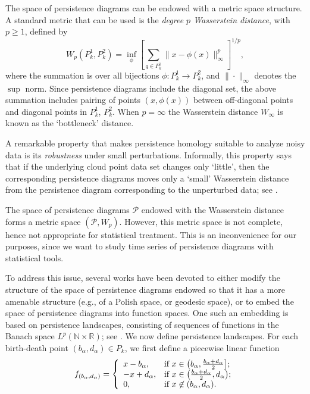 \documentclass[preprint,12pt]{elsarticle}
\theoremstyle{definition}
\theoremstyle{remark}
\numberwithin{equation}{section}
\theoremstyle{definition}
\def\N{{\mathbb N}}
\def\R{{\mathbb R}}
\begin{document}
The space of persistence diagrams can be endowed with a metric space structure.
A standard metric that can be used is  the \emph{degree $p$ Wasserstein distance}, with $p\geq 1$, defined by
\[ W_{p}( P^1_k, P^2_k)=  \inf_{\phi}\left[\sum_{q\in P^1_k} \|x- \phi(x)\|^p_\infty\right]^{1/p},\]
where the summation is  over all bijections $\phi: P^1_k\to P^2_k$, and $\|\cdot\|_\infty$ denotes the $\sup$ norm. Since persistence diagrams include the diagonal set, the above summation includes pairing of points $(x,\phi(x))$ between off-diagonal points and diagonal points in $P^1_k$, $P^2_k$. When $p=\infty$ the Wasserstein distance $W_\infty$  is known as the `bottleneck' distance.


A remarkable property that makes persistence homology suitable to analyze noisy data is its \emph{robustness} under small perturbations. Informally, this property says that if the underlying cloud point data set changes only `little', then the  corresponding  persistence diagrams moves only a `small' Wasserstein distance from the persistence diagram
corresponding to the unperturbed data; see \cite{Cohen-Steiner}.


The space of persistence diagrams $\mathscr{P}$ endowed with the Wasserstein distance forms a metric space $(\mathscr{P}, W_p)$. However, this metric space is not complete, hence not appropriate for statistical treatment.
This is an inconvenience for our purposes, since we want to study time series of persistence diagrams with statistical tools.


To address this issue, several works have been devoted to either modify the structure of the space of persistence diagrams endowed so that it has a more amenable structure (e.g., of a Polish space, or geodesic space), or to embed the space of persistence diagrams into function spaces. One such an embedding is based on persistence landscapes, consisting of sequences of functions in the  Banach space $L^p(\N\times \R)$; see  \cite{Bubenik15,Bubenik16}.
We now define persistence landscapes. For each birth-death point $(b_\alpha,d_\alpha) \in P_k$, we first define a piecewise linear function
\begin{equation}\label{eqn:landscape_1}
f_{(b_\alpha,d_\alpha)}=\left\{
                          \begin{array}{ll}
                            x-b_\alpha, & \hbox{if $x\in\left(b_\alpha,\frac{b_\alpha+d_\alpha}{2}\right]$;} \\
                            -x+d_\alpha, & \hbox{if $x\in\left(\frac{b_\alpha+d_\alpha}{2},d_\alpha\right)$;} \\
                            0, & \hbox{if $x\not\in (b_\alpha, d_\alpha)$.}
                          \end{array}
                        \right.
\end{equation}
\end{document}
